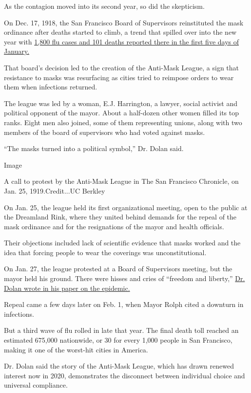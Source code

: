 As the contagion moved into its second year, so did the skepticism.

On Dec. 17, 1918, the San Francisco Board of Supervisors reinstituted
the mask ordinance after deaths started to climb, a trend that spilled
over into the new year with
\href{https://www.cdc.gov/flu/pandemic-resources/1918-commemoration/pandemic-timeline-1918.htm}{1,800
flu cases and 101 deaths reported there in the first five days of
January.}

That board's decision led to the creation of the Anti-Mask League, a
sign that resistance to masks was resurfacing as cities tried to
reimpose orders to wear them when infections returned.

The league was led by a woman, E.J. Harrington, a lawyer, social
activist and political opponent of the mayor. About a half-dozen other
women filled its top ranks. Eight men also joined, some of them
representing unions, along with two members of the board of supervisors
who had voted against masks.

``The masks turned into a political symbol,'' Dr. Dolan said.

Image

A call to protest by the Anti-Mask League in The San Francisco
Chronicle, on Jan. 25, 1919.Credit...UC Berkley

On Jan. 25, the league held its first organizational meeting, open to
the public at the Dreamland Rink, where they united behind demands for
the repeal of the mask ordinance and for the resignations of the mayor
and health officials.

Their objections included lack of scientific evidence that masks worked
and the idea that forcing people to wear the coverings was
unconstitutional.

On Jan. 27, the league protested at a Board of Supervisors meeting, but
the mayor held his ground. There were hisses and cries of ``freedom and
liberty,'' \href{https://escholarship.org/uc/item/5q91q53r}{Dr. Dolan
wrote in his paper on the epidemic.}

Repeal came a few days later on Feb. 1, when Mayor Rolph cited a
downturn in infections.

But a third wave of flu rolled in late that year. The final death toll
reached an estimated 675,000 nationwide, or 30 for every 1,000 people in
San Francisco, making it one of the worst-hit cities in America.

Dr. Dolan said the story of the Anti-Mask League, which has drawn
renewed interest now in 2020, demonstrates the disconnect between
individual choice and universal compliance.


